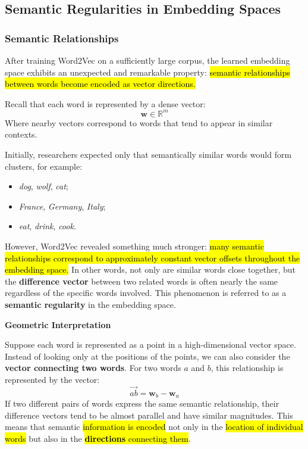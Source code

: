 \subsection{Semantic Regularities in Embedding Spaces}\label{sec:semantic-regularities-in-embedding-spaces}

\subsubsection{Semantic Relationships}\label{sec:semantic-relationships}

After training Word2Vec on a sufficiently large corpus, the learned embedding space exhibits an unexpected and remarkable property: \hl{semantic relationships between words become encoded as vector directions.}

\highspace
Recall that each word is represented by a dense vector:
\begin{equation*}
    \mathbf{w} \in \mathbb{R}^{m}
\end{equation*}
Where nearby vectors correspond to words that tend to appear in similar contexts.

\highspace
Initially, researchers expected only that semantically similar words would form clusters, for example:
\begin{itemize}
    \item \emph{dog}, \emph{wolf}, \emph{cat};
    \item \emph{France}, \emph{Germany}, \emph{Italy};
    \item \emph{eat}, \emph{drink}, \emph{cook}.
\end{itemize}
However, Word2Vec revealed something much stronger: \hl{many semantic relationships correspond to approximately constant vector offsets throughout the embedding space.} In other words, not only are similar words close together, but the \textbf{difference vector} between two related words is often nearly the same regardless of the specific words involved. This phenomenon is referred to as a \textbf{semantic regularity} in the embedding space.

\highspace
\begin{flushleft}
    \textcolor{Green3}{ \textbf{Geometric Interpretation}}
\end{flushleft}
Suppose each word is represented as a point in a high-dimensional vector space. Instead of looking only at the positions of the points, we can also consider the \textbf{vector connecting two words}. For two words $a$ and $b$, this relationship is represented by the vector:
\begin{equation*}
    \overrightarrow{ab} = \mathbf{w}_b - \mathbf{w}_a
\end{equation*}
If two different pairs of words express the same semantic relationship, their difference vectors tend to be almost parallel and have similar magnitudes. This means that semantic \hl{information is encoded} not only in the \hl{location of individual words} but also in the \hl{\textbf{directions} connecting them}.

